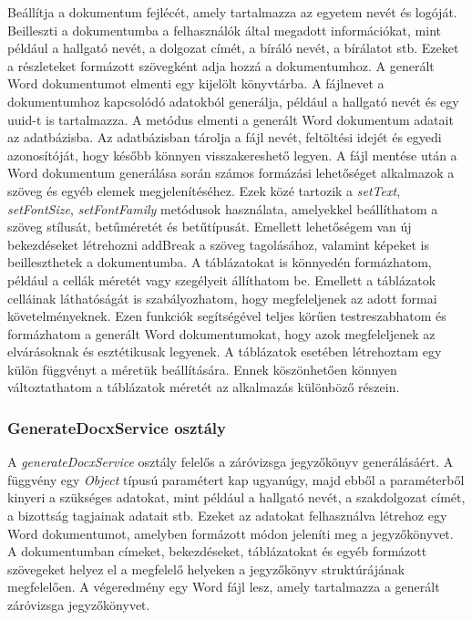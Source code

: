 Beállítja a dokumentum fejlécét, amely tartalmazza az egyetem nevét és logóját. Beilleszti a dokumentumba a felhasználók által megadott információkat, mint például a hallgató nevét, a dolgozat címét, a bíráló nevét, a bírálatot stb. Ezeket a részleteket formázott szövegként adja hozzá a dokumentumhoz. A generált Word dokumentumot elmenti egy kijelölt könyvtárba. A fájlnevet a dokumentumhoz kapcsolódó adatokból generálja, például a hallgató nevét és egy uuid-t is tartalmazza. A metódus elmenti a generált Word dokumentum adatait az adatbázisba. Az adatbázisban tárolja a fájl nevét, feltöltési idejét és egyedi azonosítóját, hogy később könnyen visszakereshető legyen. A fájl mentése után a Word dokumentum generálása során számos formázási lehetőséget alkalmazok a szöveg és egyéb elemek megjelenítéséhez. Ezek közé tartozik a \textit{setText}, \textit{setFontSize}, \textit{setFontFamily} metódusok használata, amelyekkel beállíthatom a szöveg stílusát, betűméretét és betűtípusát. Emellett lehetőségem van új bekezdéseket létrehozni addBreak a szöveg tagolásához, valamint képeket is beilleszthetek a dokumentumba. A táblázatokat is könnyedén formázhatom, például a cellák méretét vagy szegélyeit állíthatom be. Emellett a táblázatok celláinak láthatóságát is szabályozhatom, hogy megfeleljenek az adott formai követelményeknek. Ezen funkciók segítségével teljes körűen testreszabhatom és formázhatom a generált Word dokumentumokat, hogy azok megfeleljenek az elvárásoknak és esztétikusak legyenek. A táblázatok esetében létrehoztam egy külön függvényt a méretük beállítására. Ennek köszönhetően könnyen változtathatom a táblázatok méretét az alkalmazás különböző részein.

\subsubsection{GenerateDocxService osztály}

A \textit{generateDocxService} osztály felelős a záróvizsga jegyzőkönyv generálásáért. A függvény egy \textit{Object} típusú paramétert kap ugyanúgy, majd ebből a paraméterből kinyeri a szükséges adatokat, mint például a hallgató nevét, a szakdolgozat címét, a bizottság tagjainak adatait stb. Ezeket az adatokat felhasználva létrehoz egy Word dokumentumot, amelyben formázott módon jeleníti meg a jegyzőkönyvet. A dokumentumban címeket, bekezdéseket, táblázatokat és egyéb formázott szövegeket helyez el a megfelelő helyeken a jegyzőkönyv struktúrájának megfelelően. A végeredmény egy Word fájl lesz, amely tartalmazza a generált záróvizsga jegyzőkönyvet.


